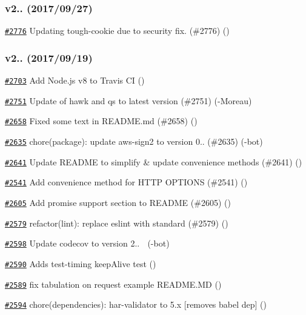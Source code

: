\subsubsection*{v2.. (2017/09/27)}


\begin{DoxyItemize}
\item \href{https://github.com/request/request/pull/2776}{\tt \#2776} Updating tough-\/cookie due to security fix. (\#2776) ()
\end{DoxyItemize}

\subsubsection*{v2.. (2017/09/19)}


\begin{DoxyItemize}
\item \href{https://github.com/request/request/pull/2703}{\tt \#2703} Add Node.\+js v8 to Travis CI ()
\item \href{https://github.com/request/request/pull/2751}{\tt \#2751} Update of hawk and qs to latest version (\#2751) (-\/\+Moreau)
\item \href{https://github.com/request/request/pull/2658}{\tt \#2658} Fixed some text in R\+E\+A\+D\+M\+E.\+md (\#2658) ()
\item \href{https://github.com/request/request/pull/2635}{\tt \#2635} chore(package)\+: update aws-\/sign2 to version 0.. (\#2635) (-\/bot)
\item \href{https://github.com/request/request/pull/2641}{\tt \#2641} Update R\+E\+A\+D\+ME to simplify \& update convenience methods (\#2641) ()
\item \href{https://github.com/request/request/pull/2541}{\tt \#2541} Add convenience method for H\+T\+TP O\+P\+T\+I\+O\+NS (\#2541) ()
\item \href{https://github.com/request/request/pull/2605}{\tt \#2605} Add promise support section to R\+E\+A\+D\+ME (\#2605) ()
\item \href{https://github.com/request/request/pull/2579}{\tt \#2579} refactor(lint)\+: replace eslint with standard (\#2579) ()
\item \href{https://github.com/request/request/pull/2598}{\tt \#2598} Update codecov to version 2.. 🚀 (-\/bot)
\item \href{https://github.com/request/request/pull/2590}{\tt \#2590} Adds test-\/timing keep\+Alive test ()
\item \href{https://github.com/request/request/pull/2589}{\tt \#2589} fix tabulation on request example R\+E\+A\+D\+M\+E.\+MD ()
\item \href{https://github.com/request/request/pull/2594}{\tt \#2594} chore(dependencies)\+: har-\/validator to 5.\+x \mbox{[}removes babel dep\mbox{]} ()
\end{DoxyItemize}


